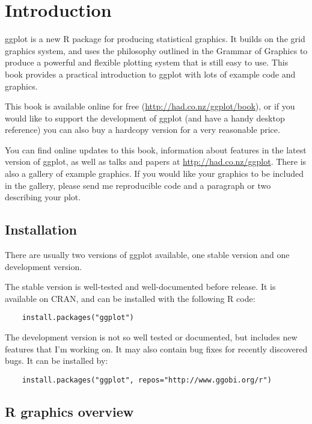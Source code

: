 

\chapter{Introduction}

ggplot is a new R package for producing statistical graphics.  It builds on the grid graphics system, and uses the philosophy outlined in the Grammar of Graphics to produce a powerful and flexible plotting system that is still easy to use.  This book provides a practical introduction to ggplot with lots of example code and graphics.  


This book is available online for free (\url{http://had.co.nz/ggplot/book}), or if you would like to support the development of ggplot (and have a handy desktop reference) you can also buy a hardcopy version for a very reasonable price.

You can find online updates to this book, information about features in the latest version of ggplot, as well as talks and papers at \url{http://had.co.nz/ggplot}.  There is also a gallery of example graphics.  If you would like your graphics to be included in the gallery, please send me reproducible code and a paragraph or two describing your plot.

\section{Installation}\label{sub:installation}

There are usually two versions of ggplot available, one stable version and one development version.

The stable version is well-tested and well-documented before release.  It is available on CRAN, and can be installed with the following R code:

\begin{verbatim}
	install.packages("ggplot")
\end{verbatim}

The development version is not so well tested or documented, but includes new features that I'm working on.  It may also contain bug fixes for recently discovered bugs.  It can be installed by:

\begin{verbatim}
	install.packages("ggplot", repos="http://www.ggobi.org/r")
\end{verbatim}

\section{R graphics overview}

